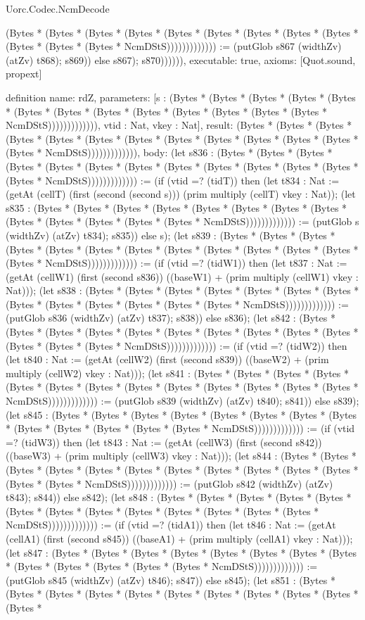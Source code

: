 \begin{lexlean}{Uorc.Codec.NcmDecode}
\begin{semanticmodule}
{(Bytes * (Bytes * (Bytes * (Bytes * (Bytes * (Bytes * (Bytes * (Bytes * (Bytes * (Bytes * (Bytes * (Bytes * NcmDStS))))))))))))) := (putGlob s867 (widthZv) (atZv) t868); s869)) else s867); s870)))))),
  executable: true,
  axioms: [Quot.sound, propext]
}

definition{
  name: rdZ,
  parameters: [s : (Bytes * (Bytes * (Bytes * (Bytes * (Bytes * (Bytes * (Bytes * (Bytes * (Bytes * (Bytes * (Bytes * (Bytes * (Bytes * NcmDStS))))))))))))), vtid : Nat, vkey : Nat],
  result: (Bytes * (Bytes * (Bytes * (Bytes * (Bytes * (Bytes * (Bytes * (Bytes * (Bytes * (Bytes * (Bytes * (Bytes * (Bytes * NcmDStS))))))))))))),
  body: (let s836 : (Bytes * (Bytes * (Bytes * (Bytes * (Bytes * (Bytes * (Bytes * (Bytes * (Bytes * (Bytes * (Bytes * (Bytes * (Bytes * NcmDStS))))))))))))) := (if (vtid =? (tidT)) then (let t834 : Nat := (getAt (cellT) (first (second (second s))) (prim multiply (cellT) vkey : Nat)); (let s835 : (Bytes * (Bytes * (Bytes * (Bytes * (Bytes * (Bytes * (Bytes * (Bytes * (Bytes * (Bytes * (Bytes * (Bytes * (Bytes * NcmDStS))))))))))))) := (putGlob s (widthZv) (atZv) t834); s835)) else s); (let s839 : (Bytes * (Bytes * (Bytes * (Bytes * (Bytes * (Bytes * (Bytes * (Bytes * (Bytes * (Bytes * (Bytes * (Bytes * (Bytes * NcmDStS))))))))))))) := (if (vtid =? (tidW1)) then (let t837 : Nat := (getAt (cellW1) (first (second s836)) ((baseW1) + (prim multiply (cellW1) vkey : Nat))); (let s838 : (Bytes * (Bytes * (Bytes * (Bytes * (Bytes * (Bytes * (Bytes * (Bytes * (Bytes * (Bytes * (Bytes * (Bytes * (Bytes * NcmDStS))))))))))))) := (putGlob s836 (widthZv) (atZv) t837); s838)) else s836); (let s842 : (Bytes * (Bytes * (Bytes * (Bytes * (Bytes * (Bytes * (Bytes * (Bytes * (Bytes * (Bytes * (Bytes * (Bytes * (Bytes * NcmDStS))))))))))))) := (if (vtid =? (tidW2)) then (let t840 : Nat := (getAt (cellW2) (first (second s839)) ((baseW2) + (prim multiply (cellW2) vkey : Nat))); (let s841 : (Bytes * (Bytes * (Bytes * (Bytes * (Bytes * (Bytes * (Bytes * (Bytes * (Bytes * (Bytes * (Bytes * (Bytes * (Bytes * NcmDStS))))))))))))) := (putGlob s839 (widthZv) (atZv) t840); s841)) else s839); (let s845 : (Bytes * (Bytes * (Bytes * (Bytes * (Bytes * (Bytes * (Bytes * (Bytes * (Bytes * (Bytes * (Bytes * (Bytes * (Bytes * NcmDStS))))))))))))) := (if (vtid =? (tidW3)) then (let t843 : Nat := (getAt (cellW3) (first (second s842)) ((baseW3) + (prim multiply (cellW3) vkey : Nat))); (let s844 : (Bytes * (Bytes * (Bytes * (Bytes * (Bytes * (Bytes * (Bytes * (Bytes * (Bytes * (Bytes * (Bytes * (Bytes * (Bytes * NcmDStS))))))))))))) := (putGlob s842 (widthZv) (atZv) t843); s844)) else s842); (let s848 : (Bytes * (Bytes * (Bytes * (Bytes * (Bytes * (Bytes * (Bytes * (Bytes * (Bytes * (Bytes * (Bytes * (Bytes * (Bytes * NcmDStS))))))))))))) := (if (vtid =? (tidA1)) then (let t846 : Nat := (getAt (cellA1) (first (second s845)) ((baseA1) + (prim multiply (cellA1) vkey : Nat))); (let s847 : (Bytes * (Bytes * (Bytes * (Bytes * (Bytes * (Bytes * (Bytes * (Bytes * (Bytes * (Bytes * (Bytes * (Bytes * (Bytes * NcmDStS))))))))))))) := (putGlob s845 (widthZv) (atZv) t846); s847)) else s845); (let s851 : (Bytes * (Bytes * (Bytes * (Bytes * (Bytes * (Bytes * (Bytes * (Bytes * (Bytes * (Bytes * (Bytes * }
\end{semanticmodule}
\end{lexlean}
